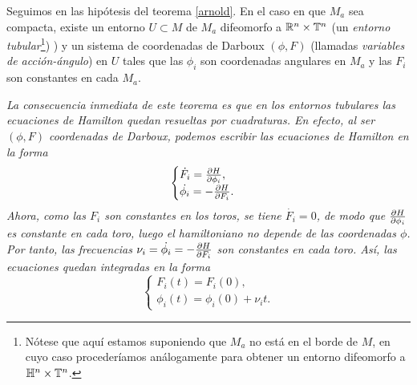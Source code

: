  \begin{thm}
   Seguimos en las hipótesis del teorema \ref{arnold}. En el caso en que $M_a$ sea compacta, existe un entorno $U\subset M$ de $M_a$ difeomorfo a $\mathbb{R}^n \times \mathbb{T}^n$ (un \emph{entorno tubular}\footnote{Nótese que aquí estamos suponiendo que $M_a$ no está en el borde de $M$, en cuyo caso procederíamos análogamente para obtener un entorno difeomorfo a $\mathbb{H}^n \times \mathbb{T}^n$.})
) y un sistema de coordenadas de Darboux $(\phi,F)$ (llamadas \emph{variables de acción-ángulo}) en $U$ tales que las $\phi_i$ son coordenadas angulares en $M_a$ y las $F_i$ son constantes en cada $M_a$. 
  \end{thm}

  \begin{obs}
    \em
    La consecuencia inmediata de este teorema es que en los entornos tubulares las ecuaciones de Hamilton quedan resueltas por cuadraturas. En efecto, al ser $(\phi,F)$ coordenadas de Darboux, podemos escribir las ecuaciones de Hamilton en la forma
    \begin{equation*}
      \begin{cases}
	\dot{F_i}=\frac{\partial H}{\partial \phi_i}, \\
	\dot{\phi_i}=-\frac{\partial H}{\partial F_i}. 
      \end{cases}
    \end{equation*}
    Ahora, como las $F_i$ son constantes en los toros, se tiene $\dot{F_i}=0$, de modo que $\frac{\partial H}{\partial \phi_i}$ es constante en cada toro, luego el hamiltoniano no depende de las coordenadas $\phi$. Por tanto, las frecuencias $\nu_i=\dot{\phi_i}=-\frac{\partial H}{\partial F_i}$ son constantes en cada toro. Así, las ecuaciones quedan integradas en la forma
    \begin{equation*}
      \begin{cases}
	F_i(t)=F_i(0), \\
	\phi_i(t)=\phi_i(0)+\nu_i t. 
      \end{cases}
    \end{equation*}
  \end{obs}


